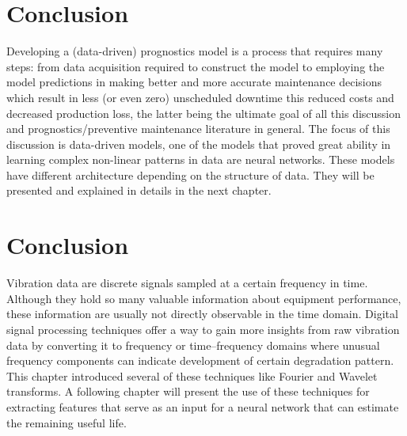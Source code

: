 \section{Conclusion}
Developing a (data-driven) prognostics model is a process that requires many steps: from data acquisition required to construct the model to employing the model predictions in making better and more accurate maintenance decisions which result in less (or even zero) unscheduled downtime this reduced costs and decreased production loss, the latter being the ultimate goal of all this discussion and prognostics/preventive maintenance literature in general. The focus of this discussion is data-driven models, one of the models that proved great ability in learning complex non-linear patterns in data are neural networks. These models have different architecture depending on the structure of data. They will be presented and explained in details in the next chapter.

\section{Conclusion}
Vibration data are discrete signals sampled at a certain frequency in time. Although they hold so many valuable information about equipment performance, these information are usually not directly observable in the time domain. Digital signal processing techniques offer a way to gain more insights from raw vibration data by converting it to frequency or time–frequency domains where unusual frequency components can indicate development of certain degradation pattern. This chapter introduced several of these techniques like Fourier and Wavelet transforms. A following chapter will present the use of these techniques for extracting features that serve as an input for a neural network that can estimate the remaining useful life.
